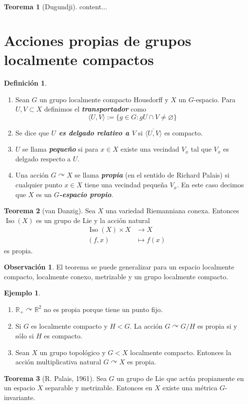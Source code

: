 \documentclass[spanish]{article}
\theoremstyle{definition}
\newtheorem*{defn}{Definición}
\newtheorem*{obs}{Observación}
\newtheorem*{teo}{Teorema}
\newtheorem*{ejem}{Ejemplo}
\newcommand{\R}{\mathbb{R}}
\begin{document}
\fi
\begin{teo}[Dugundji]
	content...
\end{teo}

\section{Acciones propias de grupos localmente compactos}
\begin{defn}\leavevmode
	\begin{enumerate}
		\item Sean $G$ un grupo localmente compacto Housdorff y $X$ un $G$-espacio. Para $U,V\subset X$ definimos el \textbf{\textit{transportador}} como
	\[\langle U,V\rangle:=\{g\in G:gU\cap V\neq\varnothing\}\]

		\item Se dice que \textbf{\textit{$U$ es delgado relativo a $V$}} si $\overline{\langle U,V\rangle}$ es compacto.

		\item $U$ se llama \textbf{\textit{pequeño}} si para $x\in X$ existe una vecindad $V_x$ tal que $V_x$ es delgado respecto a $U$.
		
		\item Una acción $G\curvearrowright X$ se llama \textbf{\textit{propia}} (en el sentido de Richard Palais) si  cualquier punto $x\in X$ tiene una vecindad pequeña $V_x$. En este caso decimos que $X$ es un \textbf{\textit{$G$-espacio propio}}.
	\end{enumerate}
\end{defn}
\begin{teo}[van Danzig]
	Sea $X$ una variedad Riemanniana conexa. Entonces $\operatorname{Iso}(X)$ es un grupo de Lie y la acción natural \begin{align*}\operatorname{Iso}(X)\times X&\to X\\
	(f,x)&\mapsto f(x)\end{align*}
	es propia.
\end{teo}
\begin{obs}
	El teorema se puede generalizar para un espacio localmente compacto, localmente conexo, metrizable y un grupo localmente compacto.
\end{obs}
\begin{ejem}\leavevmode
	\begin{enumerate}
		\item $\R_+\curvearrowright\R^2$ no es propia porque tiene un punto fijo.
		\item Si $G$ es localmente compacto y $H<G$. La acción $G\curvearrowright G/H$ es propia si y sólo si $H$ es compacto.
		\item Sean $X$ un grupo topológico y $G<X$ localmente compacto. Entonces la acción multiplicativa natural $G\curvearrowright X$ es propia.
	\end{enumerate}
\end{ejem}
\begin{teo}[R. Palais, 1961]
	Sea $G$ un grupo de Lie que actúa propiamente en un espacio $X$ separable y metrizable. Entonces en $X$ existe una métrica $G$-invariante.
\end{teo}
\end{document}
